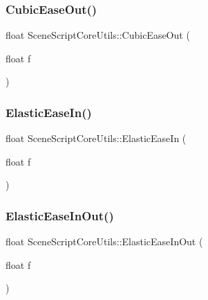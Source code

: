 \hypertarget{class_scene_script_core_utils_a2189f157a31e5066f6c2265b769020b9}{}\label{class_scene_script_core_utils_a2189f157a31e5066f6c2265b769020b9} 
\subsubsection{\texorpdfstring{Cubic\+Ease\+Out()}{CubicEaseOut()}}
{\footnotesize\ttfamily float Scene\+Script\+Core\+Utils\+::\+Cubic\+Ease\+Out (\begin{DoxyParamCaption}\item[{float}]{f }\end{DoxyParamCaption})}

\hypertarget{class_scene_script_core_utils_a6191fc57e78af24ca7c93878a6c0c62a}{}\label{class_scene_script_core_utils_a6191fc57e78af24ca7c93878a6c0c62a} 
\subsubsection{\texorpdfstring{Elastic\+Ease\+In()}{ElasticEaseIn()}}
{\footnotesize\ttfamily float Scene\+Script\+Core\+Utils\+::\+Elastic\+Ease\+In (\begin{DoxyParamCaption}\item[{float}]{f }\end{DoxyParamCaption})}

\hypertarget{class_scene_script_core_utils_a6eb7b2e8b76f55145cc7c8bef31b11f5}{}\label{class_scene_script_core_utils_a6eb7b2e8b76f55145cc7c8bef31b11f5} 
\subsubsection{\texorpdfstring{Elastic\+Ease\+In\+Out()}{ElasticEaseInOut()}}
{\footnotesize\ttfamily float Scene\+Script\+Core\+Utils\+::\+Elastic\+Ease\+In\+Out (\begin{DoxyParamCaption}\item[{float}]{f }\end{DoxyParamCaption})}

